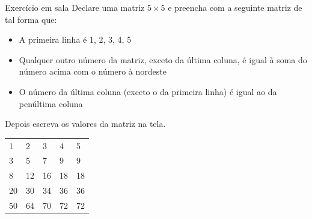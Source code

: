 \documentclass[portuguese,10pt,xcolor=table]{bredelebeamer}
\begin{document}
	\begin{frame}
		\begin{alertblock}{ Exercício em sala}
			Declare uma matriz $5 \times 5$ e preencha com a seguinte matriz de tal forma que:
			\begin{itemize}
				\item A primeira linha é 1, 2, 3, 4, 5
				\item Qualquer outro número da matriz, exceto da última coluna, é igual à soma do número acima com o número à nordeste
				\item O número da última coluna (exceto o da primeira linha) é igual ao da penúltima coluna
			\end{itemize}
			Depois escreva os valores da matriz na tela.
			\begin{table}[]
				\centering
				\begin{tabular}{lllll}
					1 & 2 & 3 & 4 & 5 \\
					3 & 5 & 7 & 9 & 9 \\
					8 & 12 & 16 & 18 & 18 \\
					20 & 30 & 34 & 36 & 36 \\
					50 & 64 & 70 & 72 & 72
				\end{tabular}
			\end{table}
		\end{alertblock}
	\end{frame}

\end{document}
